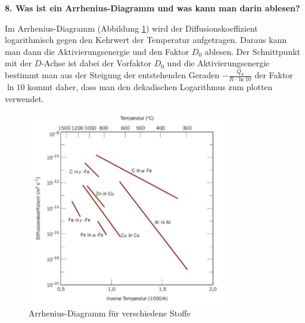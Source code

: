 \documentclass[11pt,a4paper]{article}
\numberwithin{equation}{section}
\numberwithin{figure}{section}
\begin{document}
\noindent\textbf{8. Was ist ein Arrhenius-Diagramm und was kann man darin ablesen? }\\
\begin{addmargin}[25pt]{0pt}
Im Arrhenius-Diagramm (Abbildung \ref{fig:arrhenius}) wird der Diffusionskoeffizient logarithmisch gegen den Kehrwert der Temperatur aufgetragen. Daraus kann man dann die Aktivierungsenergie und den Faktor $D_0$ ablesen. Der Schnittpunkt mit der $D$-Achse ist dabei der Vorfaktor $D_0$ und die Aktivierungsenergie bestimmt man aus der Steigung der entstehenden Geraden $-\frac{Q_d}{R\cdot\ln{10}}$ der Faktor $\ln{10}$ kommt daher, dass man den dekadischen Logarithmus zum plotten verwendet.\\
\begin{figure}[h]
    \centering
    \includegraphics[width = 0.8\textwidth]{images/Materialwissenschaften/Arrhenius.jpeg}
    \caption{Arrhenius-Diagramm für verschiedene Stoffe}
    \label{fig:arrhenius}
\end{figure}
\end{addmargin} 
\end{document}
